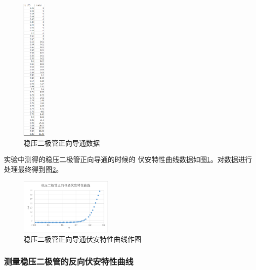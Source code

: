 \documentclass{ctexart}
\begin{document}
  \begin{figure}\label{wenyazhengxiangshujv}
    \centering
    \includegraphics[width=0.1\textwidth,height=0.4\textheight]{wenyazhengxiangshujv.png}
    \caption{稳压二极管正向导通数据}
  \end{figure}
  实验中测得的稳压二极管正向导通的时候的
  伏安特性曲线数据如图\ref{wenyazhengxiangshujv}。对数据进行处理最终得到图\ref{wenyazhengxiangzuotu}。
  \begin{figure}[H]\label{wenyazhengxiangzuotu}
    \centering
    \includegraphics[width=0.4\textwidth,height=0.3\textheight]{wenyazhengxiangzuotu.png}
    \caption{稳压二极管正向导通伏安特性曲线作图}
  \end{figure}

  \subsubsection{测量稳压二极管的反向伏安特性曲线}
\end{document}
